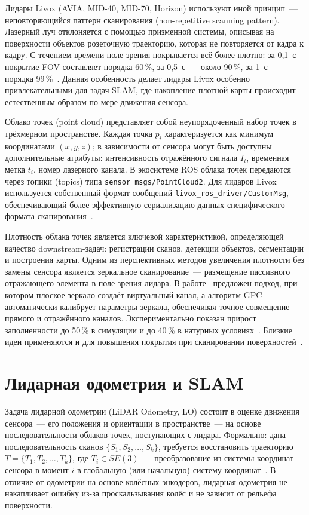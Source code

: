 \documentclass{misisarticle}
\begin{document}
Лидары Livox (AVIA, MID-40, MID-70, Horizon) используют иной принцип~--- неповторяющийся паттерн сканирования (non-repetitive scanning pattern). Лазерный луч отклоняется с помощью призменной системы, описывая на поверхности объектов розеточную траекторию, которая не повторяется от кадра к кадру. С течением времени поле зрения покрывается всё более плотно: за 0,1~с покрытие FOV составляет порядка 60\,\%, за 0,5~с~--- около 90\,\%, за 1~с~--- порядка 99\,\%~\cite{xu2021,xu2022}. Данная особенность делает лидары Livox особенно привлекательными для задач SLAM, где накопление плотной карты происходит естественным образом по мере движения сенсора.

Облако точек (point cloud) представляет собой неупорядоченный набор точек в трёхмерном пространстве. Каждая точка $p_i$ характеризуется как минимум координатами $(x,y,z)$; в зависимости от сенсора могут быть доступны дополнительные атрибуты: интенсивность отражённого сигнала $I_i$, временная метка $t_i$, номер лазерного канала. В экосистеме ROS облака точек передаются через топики (topics) типа \texttt{sensor\_msgs/PointCloud2}. Для лидаров Livox используется собственный формат сообщений \texttt{livox\_ros\_driver/CustomMsg}, обеспечивающий более эффективную сериализацию данных специфического формата сканирования~\cite{xu2021,xu2022}.

Плотность облака точек является ключевой характеристикой, определяющей качество downstream-задач: регистрации сканов, детекции объектов, сегментации и построения карты. Одним из перспективных методов увеличения плотности без замены сенсора является зеркальное сканирование~--- размещение пассивного отражающего элемента в поле зрения лидара. В работе~\cite{vishnevsky2026} предложен подход, при котором плоское зеркало создаёт виртуальный канал, а алгоритм GPC автоматически калибрует параметры зеркала, обеспечивая точное совмещение прямого и отражённого каналов. Экспериментально показан прирост заполненности до 50\,\% в симуляции и до 40\,\% в натурных условиях~\cite{vishnevsky2026,lidar3d2025}. Близкие идеи применяются и для повышения покрытия при сканировании поверхностей~\cite{flatness2021}.

\section{Лидарная одометрия и SLAM}

Задача лидарной одометрии (LiDAR Odometry, LO) состоит в оценке движения сенсора~--- его положения и ориентации в пространстве~--- на основе последовательности облаков точек, поступающих с лидара. Формально: дана последовательность сканов $\{S_1,S_2,\dots,S_k\}$, требуется восстановить траекторию $T=\{T_1,T_2,\dots,T_k\}$, где $T_i\in SE(3)$~--- преобразование из системы координат сенсора в момент $i$ в глобальную (или начальную) систему координат~\cite{thrun2005,zhang2014}. В отличие от одометрии на основе колёсных энкодеров, лидарная одометрия не накапливает ошибку из-за проскальзывания колёс и не зависит от рельефа поверхности.
\end{document}
